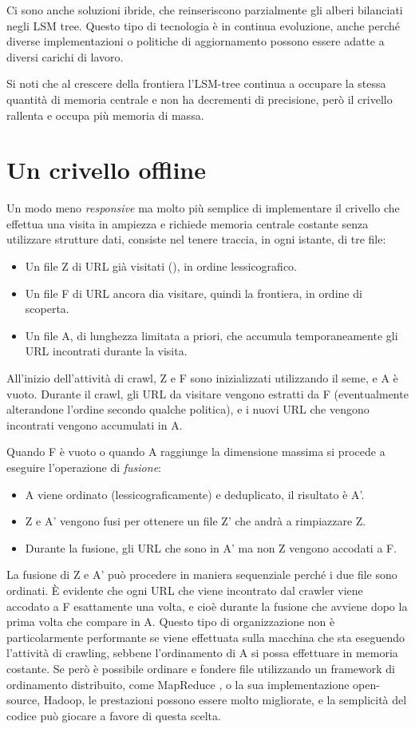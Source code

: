 Ci sono anche soluzioni ibride, che reinseriscono parzialmente gli alberi bilanciati negli LSM tree. Questo tipo di tecnologia è in continua evoluzione, anche perché diverse implementazioni o politiche di aggiornamento possono essere adatte a diversi carichi di lavoro.

Si noti che al crescere della frontiera l'LSM-tree continua a occupare la stessa quantità di memoria centrale e non ha decrementi di precisione, però il crivello rallenta e occupa più memoria di massa.
\section{Un crivello offline}
Un modo meno \textit{responsive} ma molto più semplice di implementare il crivello che effettua una visita in ampiezza e richiede memoria centrale costante senza utilizzare strutture dati, consiste nel tenere traccia, in ogni istante, di tre file:
\begin{itemize}
    \item Un file Z di URL già visitati (), in ordine lessicografico.
    \item Un file F di URL ancora dia visitare, quindi la frontiera, in ordine di scoperta.
    \item Un file A, di lunghezza limitata a priori, che accumula temporaneamente gli URL incontrati durante la visita.
\end{itemize}
All'inizio dell'attività di crawl, Z e F sono inizializzati utilizzando il seme, e A è vuoto. Durante il crawl, gli URL da visitare vengono estratti da F (eventualmente alterandone l'ordine secondo qualche politica), e i nuovi URL che vengono incontrati vengono accumulati in A.

Quando F è vuoto o quando A raggiunge la dimensione massima si procede a eseguire l'operazione di \textit{fusione}:
\begin{itemize}
    \item A viene ordinato (lessicograficamente) e deduplicato, il risultato è A'.
    \item Z e A' vengono fusi per ottenere un file Z' che andrà a rimpiazzare Z.
    \item Durante la fusione, gli URL che sono in A' ma non Z vengono accodati a F.
\end{itemize}
La fusione di Z e A' può procedere in maniera sequenziale perché i due file sono ordinati. È evidente che ogni URL che viene incontrato dal crawler viene accodato a F esattamente una volta, e cioè durante la fusione che avviene dopo la prima volta che compare in A.
Questo tipo di organizzazione non è particolarmente performante se viene effettuata sulla macchina che sta eseguendo l'attività di crawling, sebbene l'ordinamento di A si possa effettuare in memoria costante. Se però è possibile ordinare e fondere file utilizzando un framework di ordinamento distribuito, come MapReduce \cite{MapReduce}, o la sua implementazione open-source, Hadoop, le prestazioni possono essere molto migliorate, e la semplicità del codice può giocare a favore di questa scelta.


